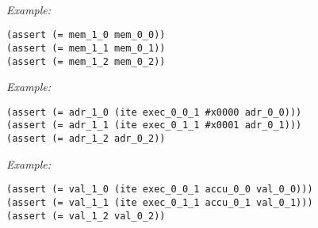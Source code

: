 ~\\
\noindent
\emph{Example:} 

\begin{lstlisting}[style=smtlib]
(assert (= mem_1_0 mem_0_0))
(assert (= mem_1_1 mem_0_1))
(assert (= mem_1_2 mem_0_2))
\end{lstlisting}



\newpage

\noindent
\emph{Example:} 

\begin{lstlisting}[style=smtlib]
(assert (= adr_1_0 (ite exec_0_0_1 #x0000 adr_0_0)))
(assert (= adr_1_1 (ite exec_0_1_1 #x0001 adr_0_1)))
(assert (= adr_1_2 adr_0_2))
\end{lstlisting}



\noindent
\emph{Example:} 

\begin{lstlisting}[style=smtlib]
(assert (= val_1_0 (ite exec_0_0_1 accu_0_0 val_0_0)))
(assert (= val_1_1 (ite exec_0_1_1 accu_0_1 val_0_1)))
(assert (= val_1_2 val_0_2))
\end{lstlisting}

